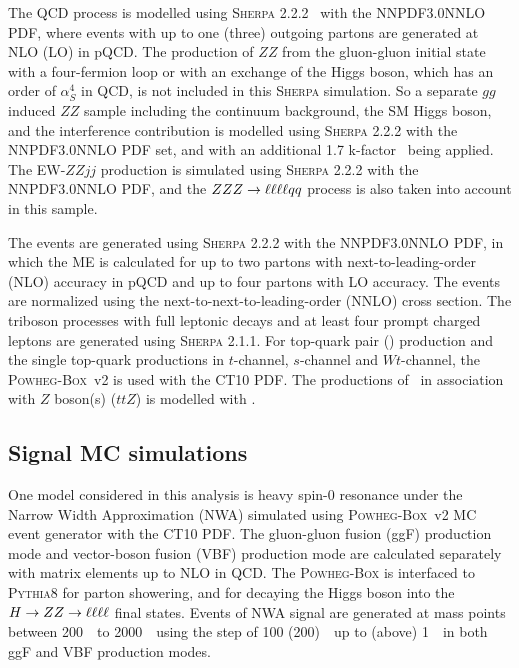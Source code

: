 The QCD \qqZZ process is modelled using \textsc{Sherpa} 2.2.2~\cite{Gleisberg:2008ta} with the NNPDF3.0NNLO~\cite{ball2015parton} PDF,
where events with up to one (three) outgoing partons are generated at NLO (LO) in pQCD.
The production of $ZZ$ from the gluon-gluon initial state with a four-fermion loop or with an exchange of the Higgs boson, which has an order of $\alpha_{S}^{4}$ in QCD, is not included in this \textsc{Sherpa} simulation.
So a separate $gg$ induced $ZZ$ sample including the continuum background, the SM Higgs boson, and the interference contribution 
is modelled using \textsc{Sherpa} 2.2.2 with the NNPDF3.0NNLO PDF set,
and with an additional 1.7 k-factor~\cite{PhysRevD.92.094028} being applied.
The EW-$ZZjj$ production is simulated using \textsc{Sherpa} 2.2.2 with the NNPDF3.0NNLO PDF, and the $ZZZ \rightarrow \ell\ell\ell\ell qq$ process is also taken into account in this sample.

The \Zjet events are generated using \textsc{Sherpa} 2.2.2 with the NNPDF3.0NNLO PDF,
in which the ME is calculated for up to two partons with next-to-leading-order (NLO) accuracy in pQCD and up to four partons with LO accuracy.
The \Zjet events are normalized using the next-to-next-to-leading-order (NNLO) cross section.
The triboson processes with full leptonic decays and at least four prompt charged leptons are generated using \textsc{Sherpa} 2.1.1.
For top-quark pair (\ttbar) production and the single top-quark productions in $t$-channel, $s$-channel and $Wt$-channel, the \textsc{Powheg-Box}~v2 is used with the CT10 PDF.
The productions of \ttbar~in association with $Z$ boson(s) ($ttZ$) is modelled with \MGMCatNLO.

\subsection{Signal MC simulations}
\label{sec:hmhzz_signal_mc}

One model considered in this analysis is heavy spin-0 resonance under the Narrow Width Approximation (NWA) simulated using \textsc{Powheg-Box}~v2 MC event generator with the CT10 PDF.
The gluon-gluon fusion (ggF) production mode and vector-boson fusion (VBF) production mode are calculated separately with matrix elements up to NLO in QCD.
The \textsc{Powheg-Box} is interfaced to \textsc{Pythia8} for parton showering, and for decaying the Higgs boson into the $H \rightarrow ZZ \rightarrow \ell\ell\ell\ell$ final states.
Events of NWA signal are generated at mass points between 200~\gev~to 2000~\gev~using the step of 100 (200)~\gev~up to (above) 1~\tev~in both ggF and VBF production modes.

